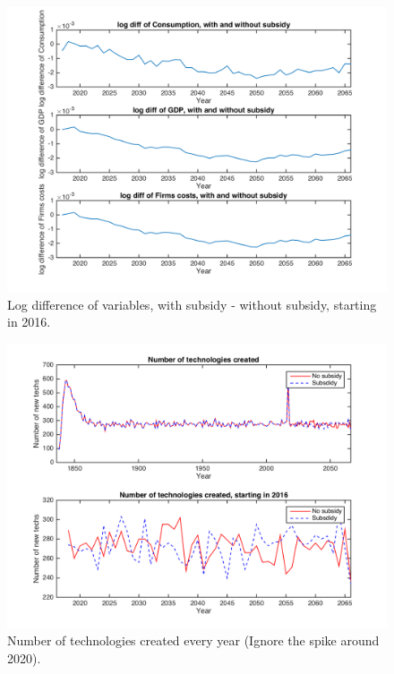 \documentclass[a4paper,11pt]{article}
\theoremstyle{prop}
\theoremstyle{lemma}
\begin{document}
\begin{figure}
\centering
\includegraphics[scale=.6]{aggregates_diffNC_50y}
\caption{Log difference of variables, with subsidy - without subsidy, starting in 2016.}
\end{figure}

\begin{figure}
\centering
\includegraphics[scale=.6]{tech_creationNC_50y}
\caption{Number of technologies created every year (Ignore the spike around 2020).}
\end{figure}
\end{document}

